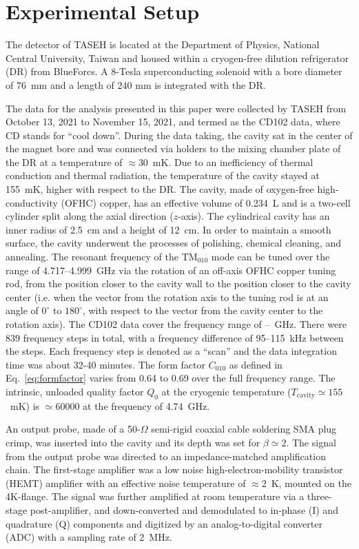 
\section{Experimental Setup}\label{sec:taseh} 
The detector of TASEH is located at the Department of Physics, National 
Central University, Taiwan and housed within a cryogen-free dilution 
refrigerator (DR) from BlueForcs. A 8-Tesla superconducting solenoid with a 
bore diameter of 76~mm and a length of 240 mm is integrated with the DR. 

The data for the analysis presented in this paper were collected by TASEH 
from October 13, 2021 to November 15, 2021, and termed as the CD102 data, 
where CD stands for ``cool down''. 
During the data taking, the cavity sat in the center of the magnet bore 
and was connected via holders 
to the mixing chamber plate of the DR at a temperature of $\approx$30~mK. 
Due to an inefficiency of thermal conduction and thermal radiation, 
the temperature of the cavity stayed at 155~mK, higher with respect to the DR.
The cavity, made of oxygen-free high-conductivity (OFHC) copper, has an 
effective volume of 0.234~L and is a two-cell cylinder split along 
the axial direction ($z$-axis). 
The cylindrical cavity has an inner radius of 2.5~cm and a 
height of 12~cm.  In order to maintain a smooth surface, the cavity underwent 
the processes of polishing, chemical cleaning, and annealing. The resonant 
frequency of the TM$_{010}$ mode can be tuned over the range of 
4.717--4.999~GHz via the rotation of an off-axis OFHC copper tuning rod, from 
the position closer to the cavity wall to the position closer to the cavity 
center (i.e. when the vector from the rotation axis to the tuning rod is 
at an angle of $0^\circ$ to $180^\circ$, with respect to the vector from the 
cavity center to the rotation axis). 
The CD102 data cover the frequency range of \flo--\fhi~GHz. 
There were 839 frequency steps in total, with a frequency difference of 
95--115~kHz between the steps. Each frequency step is denoted as a ``scan'' 
and the data integration time was about 32-40 minutes. 
The form factor $C_{010}$ as defined in 
Eq.~\eqref{eq:formfactor} varies from 0.64 to 0.69 over the full frequency 
range.  
The intrinsic, unloaded quality factor $Q_0$ at the cryogenic temperature 
($T_\mathrm{cavity}\simeq 155$~mK) is $\simeq 60000$ at the frequency of 
4.74~GHz.

An output probe, made of a 50-$\Omega$ semi-rigid coaxial cable 
soldering SMA plug crimp, was inserted into the cavity and its depth was set for 
$\beta\simeq2$.  The signal from the output probe was directed to an 
impedance-matched amplification chain. The first-stage amplifier was 
a low noise high-electron-mobility transistor (HEMT) amplifier with an 
effective noise temperature of $\approx 2$~K, mounted on the 4K-flange. 
The signal was further amplified at room temperature via a 
three-stage post-amplifier, and down-converted 
and demodulated to in-phase (I) and quadrature (Q) components and digitized 
by an analog-to-digital converter (ADC) with a sampling rate of 2~MHz. 

